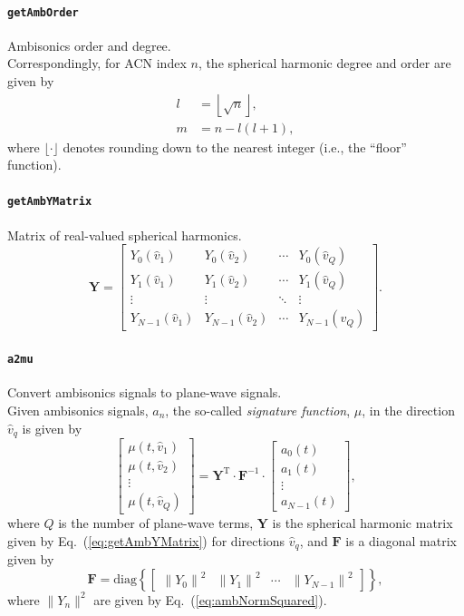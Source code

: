 \documentclass[11pt, oneside]{article}
\newcommand{\eqnref}[1]{Eq.~(\ref{#1})}
\newcommand{\function}[1]{\paragraph*{\texttt{#1}}}
\begin{document}
\function{getAmbOrder} Ambisonics order and degree. \\
Correspondingly, for ACN index $n$, the spherical harmonic degree and order are given by
\begin{equation}\label{eq:getAmbOrder}
\begin{aligned}
l &= \left\lfloor \sqrt{n} \right\rfloor,\\
m &= n - l (l + 1),
\end{aligned}
\end{equation}
where $\lfloor \cdot \rfloor$ denotes rounding down to the nearest integer (i.e., the ``floor'' function).

\function{getAmbYMatrix} Matrix of real-valued spherical harmonics. \\
\begin{equation}\label{eq:getAmbYMatrix}
\mathbf{Y} = 
\begin{bmatrix}
Y_{0}(\hat{v}_1) & Y_{0}(\hat{v}_2) & \cdots & Y_{0}(\hat{v}_Q) \\
Y_{1}(\hat{v}_1) & Y_{1}(\hat{v}_2) & \cdots & Y_{1}(\hat{v}_Q) \\
\vdots & \vdots & \ddots & \vdots \\
Y_{N-1}(\hat{v}_1) & Y_{N-1}(\hat{v}_2) & \cdots & Y_{N-1}(\hat{v}_Q)
\end{bmatrix}.
\end{equation}

\function{a2mu} Convert ambisonics signals to plane-wave signals. \\
Given ambisonics signals, $a_n$, the so-called \textit{signature function}, $\mu$, in the direction $\hat{v}_q$ is given by~\citep[section~2.3.3]{GumerovDuraiswami2005}
\begin{equation}\label{eq:a2mu}
\begin{bmatrix}
\mu(t,\hat{v}_1) \\ \mu(t,\hat{v}_2) \\ \vdots \\ \mu(t,\hat{v}_Q)
\end{bmatrix} 
= \mathbf{Y}^{\textrm{T}} \cdot \mathbf{F}^{-1} \cdot
\begin{bmatrix}
a_{0}(t) \\ a_{1}(t) \\ \vdots \\ a_{N-1}(t)
\end{bmatrix},
\end{equation}
where $Q$ is the number of plane-wave terms, $\mathbf{Y}$ is the spherical harmonic matrix given by \eqnref{eq:getAmbYMatrix} for directions $\hat{v}_q$, and $\mathbf{F}$ is a diagonal matrix given by
\begin{equation}
\mathbf{F} = \text{diag} \left\{ \begin{bmatrix} \left\|Y_0\right\|^{2} & \left\|Y_1\right\|^{2} & \cdots & \left\|Y_{N-1}\right\|^{2} \end{bmatrix} \right\},
\end{equation}
where $\|Y_n\|^2$ are given by \eqnref{eq:ambNormSquared}.
\end{document}
